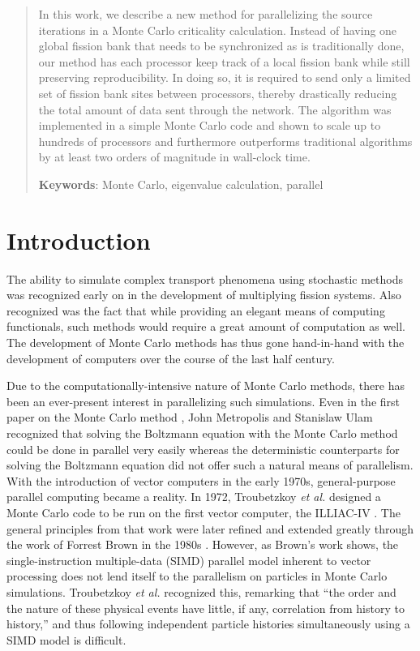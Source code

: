 \documentclass[11pt]{article}
\newcommand{\Keywords}[1]{\vspace{12pt}\par\noindent
{\small{\bf Keywords\/}: #1}}
\begin{document}
\begin{abstract}
In this work, we describe a new method for parallelizing the source
iterations in a Monte Carlo criticality calculation. Instead of having
one global fission bank that needs to be synchronized as is
traditionally done, our method has each processor keep track of a
local fission bank while still preserving reproducibility. In doing
so, it is required to send only a limited set of fission bank sites
between processors, thereby drastically reducing the total amount of
data sent through the network. The algorithm was implemented in a
simple Monte Carlo code and shown to scale up to hundreds of
processors and furthermore outperforms traditional algorithms by at
least two orders of magnitude in wall-clock time.

\Keywords{Monte Carlo, eigenvalue calculation, parallel}
\end{abstract}

\pagebreak

\doublespacing

\section{Introduction}

The ability to simulate complex transport phenomena using stochastic
methods was recognized early on in the development of multiplying
fission systems. Also recognized was the fact that while providing an
elegant means of computing functionals, such methods would require a
great amount of computation as well. The development of Monte Carlo
methods has thus gone hand-in-hand with the development of computers
over the course of the last half century.

Due to the computationally-intensive nature of Monte Carlo methods,
there has been an ever-present interest in parallelizing such
simulations. Even in the first paper on the Monte Carlo method
\cite{metropolis}, John Metropolis and Stanislaw Ulam recognized that
solving the Boltzmann equation with the Monte Carlo method could be
done in parallel very easily whereas the deterministic counterparts
for solving the Boltzmann equation did not offer such a natural means
of parallelism. With the introduction of vector computers in the early
1970s, general-purpose parallel computing became a reality. In 1972,
Troubetzkoy {\em et al.}  designed a Monte Carlo code to be run on the
first vector computer, the ILLIAC-IV \cite{troubetzkoy}. The general
principles from that work were later refined and extended greatly
through the work of Forrest Brown in the 1980s
\cite{brown-vector}. However, as Brown's work shows, the
single-instruction multiple-data (SIMD) parallel model inherent to
vector processing does not lend itself to the parallelism on particles
in Monte Carlo simulations. Troubetzkoy {\em et al.} recognized this,
remarking that ``the order and the nature of these physical events
have little, if any, correlation from history to history,'' and thus
following independent particle histories simultaneously using a SIMD
model is difficult.
\end{document}
